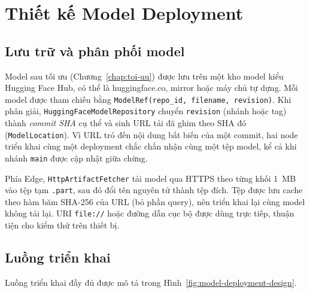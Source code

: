\section{Thiết kế Model Deployment}

\subsection{Lưu trữ và phân phối model}

Model sau tối ưu (Chương~\ref{chap:toi-uu}) được lưu trên một kho model kiểu
Hugging Face Hub, có thể là huggingface.co, mirror hoặc máy chủ tự dựng. Mỗi
model được tham chiếu bằng \texttt{ModelRef(repo\_id, filename, revision)}.
Khi phân giải, \texttt{HuggingFaceModelRepository} chuyển \texttt{revision}
(nhánh hoặc tag) thành \emph{commit SHA} cụ thể và sinh URL tải đã ghim theo SHA
đó (\texttt{ModelLocation}). Vì URL trỏ đến nội dung bất biến của một commit, hai
node triển khai cùng một deployment chắc chắn nhận cùng một tệp model, kể cả khi
nhánh \texttt{main} được cập nhật giữa chừng.

Phía Edge, \texttt{HttpArtifactFetcher} tải model qua HTTPS theo từng khối 1~MB
vào tệp tạm \texttt{.part}, sau đó đổi tên nguyên tử thành tệp đích. Tệp được lưu
cache theo hàm băm SHA-256 của URL (bỏ phần query), nên triển khai lại cùng model
không tải lại. URI \texttt{file://} hoặc đường dẫn cục bộ được dùng trực tiếp,
thuận tiện cho kiểm thử trên thiết bị.

\subsection{Luồng triển khai}

Luồng triển khai đầy đủ được mô tả trong Hình~\ref{fig:model-deployment-design}.

